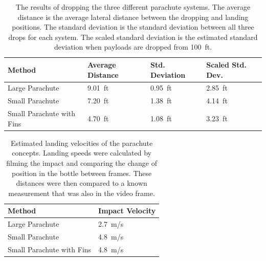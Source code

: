 \documentclass[]{auvsi_doc}
\begin{document}
\begin{table}[h!]
\caption{The results of dropping the three different parachute systems. The average distance is the average lateral distance between the dropping and landing positions. The standard deviation is the standard deviation between all three drops for each system. The scaled standard deviation is the estimated standard deviation when payloads are dropped from 100~ft. }
\label{table:results}

\begin{tabular}{| l | l | l | l |}
\hline
\rowcolor[HTML]{C0C0C0}
Method & Average Distance & Std. Deviation & Scaled Std. Dev.\\
\hline
Large Parachute & 9.01~ft  & 0.95~ft & 2.85~ft\\
Small Parachute & 7.20~ft  & 1.38~ft & 4.14~ft\\
Small Parachute with Fins & 4.70~ft & 1.08~ft & 3.23~ft\\
\hline

\end{tabular}

\end{table}

\begin{table}[h!]
\caption{Estimated landing velocities of the parachute concepts. Landing speeds were calculated by filming the impact and comparing the change of position in the bottle between frames. These distances were then compared to a known measurement that was also in the video frame.}
\label{table:results_v}

\begin{tabular}{| l | l |}
\hline
\rowcolor[HTML]{C0C0C0}
Method & Impact Velocity\\
\hline
Large Parachute & 2.7~m/s \\
Small Parachute & 4.8~m/s \\
Small Parachute with Fins & 4.8~m/s \\
\hline

\end{tabular}

\end{table}
\end{document}
